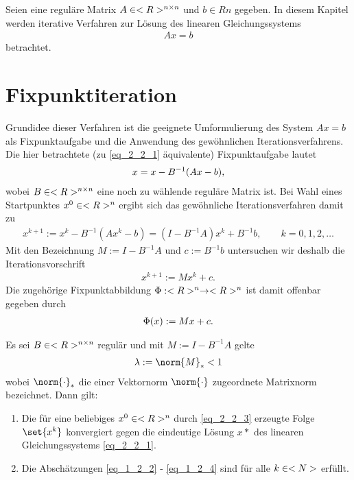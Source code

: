 Seien eine reguläre Matrix $A \in <R>^{n \times n}$ und $b \in Rn$ gegeben. In diesem Kapitel werden iterative Verfahren zur Lösung des linearen Gleichungssystems
\begin{align}
Ax = b\label{eq_2_2_1}
\end{align}
betrachtet.
\section{Fixpunktiteration}

Grundidee dieser Verfahren ist die geeignete Umformulierung des System $Ax = b$ als Fixpunktaufgabe und die Anwendung des gewöhnlichen Iterationsverfahrens. Die hier betrachtete (zu \cref{eq_2_2_1} äquivalente) Fixpunktaufgabe lautet
\begin{align}
	x = x - B^{-1}(Ax - b),\notag
\end{align}
wobei $B \in <R>^{n \times n}$ eine noch zu wählende reguläre Matrix ist. Bei Wahl eines Startpunktes $x^0 \in <R>^n$ ergibt sich das gewöhnliche Iterationsverfahren damit zu
\begin{align}
	x^{k+1} := x^{k} - B^{-1}(A x^k -b) = (I - B^{-1}A)x^{k} + B^{-1}b, \qquad k = 0,1,2,\dots \label{eq_2_2_2} %
\end{align}
Mit den Bezeichnung $M := I - B^{-1}A$ und $c:= B^{-1}b$ untersuchen wir deshalb die Iterationsvorschrift
\begin{align}
	x^{k+1} := Mx^k + c. \label{eq_2_2_3}
\end{align}
Die zugehörige Fixpunktabbildung $\Phi: <R>^n \to <R>^n$ ist damit offenbar gegeben durch
\begin{align}
	\Phi(x) := Mx + c.\notag
\end{align}
\begin{proposition}
	Es sei $B \in <R>^{n \times n}$ regulär und mit $M:= I - B^{-1}A$ gelte
	\begin{align}
		\lambda := \norm{M}_{\ast} < 1 \label{eq_2_1_4}
	\end{align}
	wobei $\norm{\cdot}_{\ast}$ die einer Vektornorm $\norm{\cdot}$ zugeordnete Matrixnorm bezeichnet. Dann gilt:
	\begin{enumerate} %
		\item Die für eine beliebiges $x^0 \in <R>^n$ durch \cref{eq_2_2_3} erzeugte Folge $\set{x^k}$ konvergiert gegen die eindeutige Lösung $x*$ des linearen Gleichungssystems \cref{eq_2_2_1}.
		\item Die Abschätzungen \cref{eq_1_2_2} - \cref{eq_1_2_4} sind für alle $k \in <N>$ erfüllt.
	\end{enumerate}
\end{proposition}

